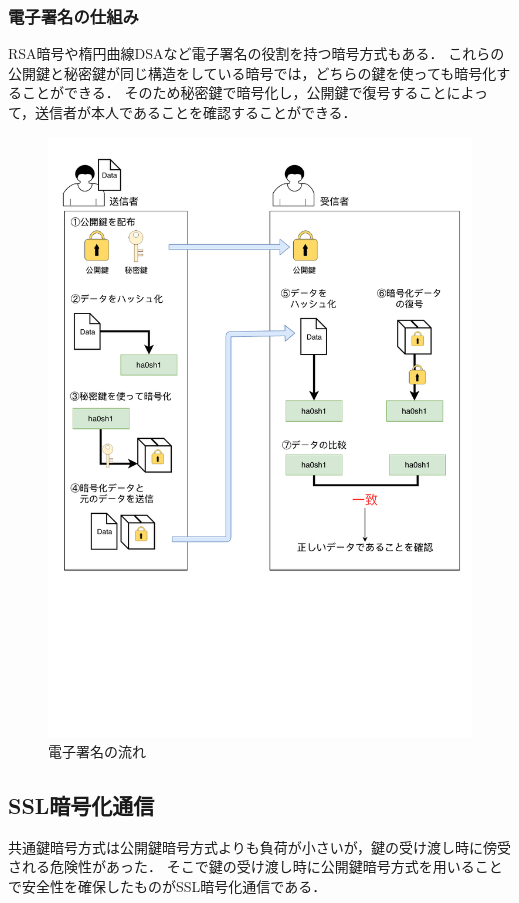 \documentclass[a4j,12pt]{jsarticle}
\begin{document}
\subsubsection{電子署名の仕組み}

RSA暗号や楕円曲線DSAなど電子署名の役割を持つ暗号方式もある．
これらの公開鍵と秘密鍵が同じ構造をしている暗号では，どちらの鍵を使っても暗号化することができる．
そのため秘密鍵で暗号化し，公開鍵で復号することによって，送信者が本人であることを確認することができる．

\begin{figure}[H]
\centering
\includegraphics[mediaboxonly=/CropBox,width=12cm]{shomei.pdf}
\caption{電子署名の流れ}
\label{fig:no}
\end{figure} 





\subsection{SSL暗号化通信}
共通鍵暗号方式は公開鍵暗号方式よりも負荷が小さいが，鍵の受け渡し時に傍受される危険性があった．
そこで鍵の受け渡し時に公開鍵暗号方式を用いることで安全性を確保したものがSSL暗号化通信である．
\end{document}
